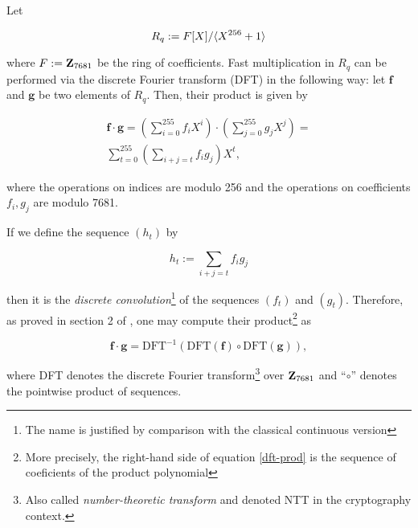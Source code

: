 
Let

\begin{equation}\label{polyn-quot-256}
	R_q := F[X]/\langle X^{256} + 1 \rangle
\end{equation}

where $F := \mathbf{Z}_{7681}$ be the ring of coefficients. Fast multiplication in
$R_q$ can be performed via the discrete Fourier transform (DFT) in the
following way: let $\mathbf{f}$ and $\mathbf{g}$ be two elements of $R_q$.
Then, their product is given by

\begin{eqnarray}\label{mult-Rq}
	\mathbf{f} \cdot \mathbf{g} = \left( \sum_{i = 0}^{255} f_i X^i
	\right) \cdot \left( \sum_{j = 0}^{255} g_j X^j \right) = \\
	\sum_{t = 0}^{255} \left( \sum_{i + j = t} f_i g_j \right) X^t,
	\nonumber 
\end{eqnarray}

where the operations on indices are modulo 256 and the operations on
coefficients $f_i, g_j$ are modulo 7681.

\bigskip

If we define the sequence $(h_t)$ by

\begin{equation}\label{h-seq-def}
	h_t := \sum_{i + j = t} f_i g_j
\end{equation}

then it is the \emph{discrete convolution}\footnote{The name is justified
by comparison with the classical continuous version} of the sequences
$(f_t)$ and $(g_t)$. Therefore, as proved in section 2 of
\cite{pollard-fftFiniteFields-1971}, one may compute their
product\footnote{More precisely, the right-hand side of equation
\eqref{dft-prod} is the sequence of coeficients of the product polynomial}
as

\begin{equation}\label{dft-prod}
	\mathbf{f} \cdot \mathbf{g} =
	\mathrm{DFT}^{-1} (\mathrm{DFT} (\mathbf{f}) \circ
	\mathrm{DFT}(\mathbf{g})),
\end{equation}

where DFT denotes the discrete Fourier transform\footnote{Also called
\emph{number-theoretic transform} and denoted NTT in the cryptography
context.} over $\mathbf{Z}_{7681}$ and ``\begin{math} \circ \end{math}'' denotes
the pointwise product of sequences.
